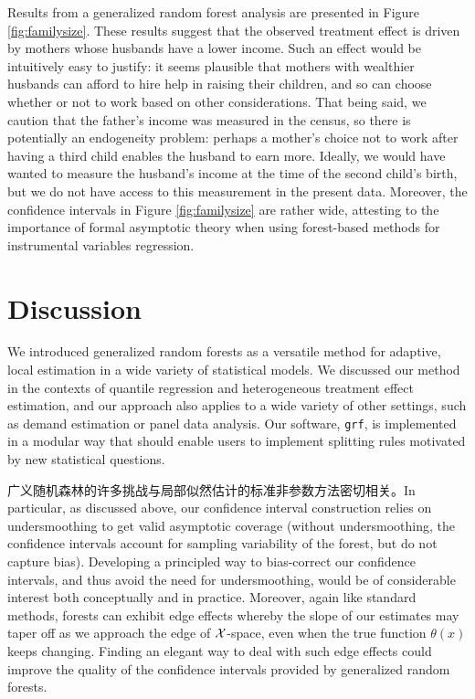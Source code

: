 \documentclass[aos]{imsart}
\theoremstyle{plain}
\theoremstyle{definition}
\theoremstyle{remark}
\begin{document}
\begin{CJK}{UTF8}{gbsn}
Results from a generalized random forest analysis are presented in Figure \ref{fig:familysize}. These results suggest that
the observed treatment effect is driven by mothers whose husbands have a lower income. Such an effect would
be intuitively easy to justify: it seems plausible that mothers with wealthier husbands can afford to hire help in raising their children,
and so can choose whether or not to work based on other considerations. That being said, we caution
that the father's income was measured in the census, so there is potentially an endogeneity
problem: perhaps a mother's choice not to work after having a third child enables the husband to earn more.
Ideally, we would have wanted to measure the husband's income at the time of the second child's birth, but
we do not have access to this measurement in the present data. Moreover, the confidence intervals in Figure \ref{fig:familysize}
are rather wide, attesting to the importance of formal asymptotic theory when using forest-based methods for instrumental
variables regression.

\section{Discussion}

We introduced generalized random forests as a versatile method for adaptive,
local estimation in a wide variety of statistical models. We discussed our method
in the contexts of quantile regression and heterogeneous treatment effect estimation,
and our approach also applies to a wide variety of other settings, such as
demand estimation or panel data analysis. Our software, \texttt{grf},
is implemented in a modular way that should enable users to implement
splitting rules motivated by new statistical questions.


广义随机森林的许多挑战与局部似然估计的标准非参数方法密切相关。In particular, as discussed
above, our confidence interval construction relies on undersmoothing to get valid asymptotic
coverage (without undersmoothing, the confidence intervals account for sampling variability of
the forest, but do not capture bias). Developing a principled way to bias-correct our confidence
intervals, and thus avoid the need for undersmoothing, would be of considerable interest both
conceptually and in practice. Moreover, again like standard methods, forests can exhibit edge
effects whereby the slope of our estimates  may taper off
as we approach the edge of $\mathcal{X}$-space, even when the true function $\theta(x)$ keeps
changing. Finding an elegant way to deal with such edge effects could improve the
quality of the confidence intervals provided by generalized random forests.


\end{CJK}
\end{document}
